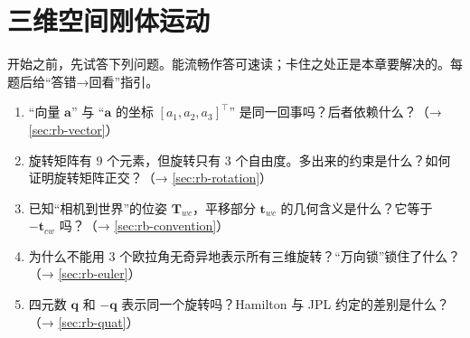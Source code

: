 \chapter{三维空间刚体运动}
\label{ch:rigid_body}


\begin{practice}[前置自测]
开始之前，先试答下列问题。能流畅作答可速读；卡住之处正是本章要解决的。每题后给“答错→回看”指引。
\begin{enumerate}
  \item “向量 $\mathbf{a}$” 与 “$\mathbf{a}$ 的坐标 $[a_1,a_2,a_3]^\top$” 是同一回事吗？后者依赖什么？（→ \cref{sec:rb-vector}）
  \item 旋转矩阵有 $9$ 个元素，但旋转只有 $3$ 个自由度。多出来的约束是什么？如何证明旋转矩阵正交？（→ \cref{sec:rb-rotation}）
  \item 已知“相机到世界”的位姿 $\mathbf{T}_{wc}$，平移部分 $\mathbf{t}_{wc}$ 的几何含义是什么？它等于 $-\mathbf{t}_{cw}$ 吗？（→ \cref{sec:rb-convention}）
  \item 为什么不能用 $3$ 个欧拉角无奇异地表示所有三维旋转？“万向锁”锁住了什么？（→ \cref{sec:rb-euler}）
  \item 四元数 $\mathbf{q}$ 和 $-\mathbf{q}$ 表示同一个旋转吗？Hamilton 与 JPL 约定的差别是什么？（→ \cref{sec:rb-quat}）
\end{enumerate}
\end{practice}

